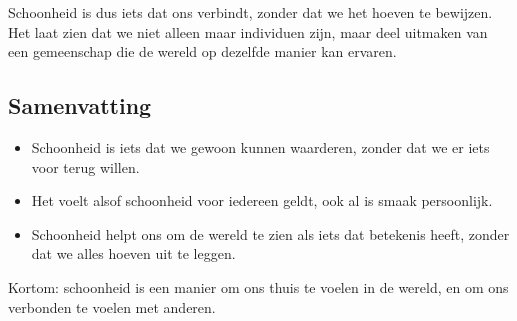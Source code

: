 \documentclass[11pt, showtrims]{memoir}
\begin{document}
Schoonheid is dus iets dat ons verbindt, zonder dat we het hoeven te bewijzen. Het laat zien dat we niet alleen maar individuen zijn, maar deel uitmaken van een gemeenschap die de wereld op dezelfde manier kan ervaren.

\subsection*{Samenvatting}

\begin{itemize}
    \item Schoonheid is iets dat we gewoon kunnen waarderen, zonder dat we er iets voor terug willen.
    \item Het voelt alsof schoonheid voor iedereen geldt, ook al is smaak persoonlijk.
    \item Schoonheid helpt ons om de wereld te zien als iets dat betekenis heeft, zonder dat we alles hoeven uit te leggen.
\end{itemize}

Kortom: schoonheid is een manier om ons thuis te voelen in de wereld, en om ons verbonden te voelen met anderen.
\end{document}

